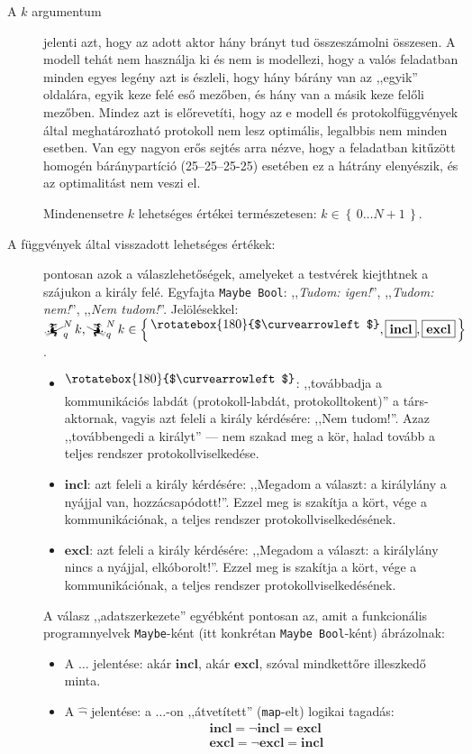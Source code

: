 \documentclass{article}
\newcommand{\nothing}{\text{\raisebox{0.4em}{\rotatebox{180}{$\curvearrowleft$}}}}%
\newcommand{\just}[1]{\boxed{#1}}%
\newcommand{\incl}{\mathbf{incl}}
\newcommand{\excl}{\mathbf{excl}}
\newcommand{\setOf}[1]{\left\lbrace\,#1\,\right\rbrace}
\newcommand{\mainfunA}[3]{\mathwitch_{#2}^{#1}#3}
\newcommand{\mainfunB}[3]{\reversemathwitch_{#2}^{#1}#3}
\begin{document}
\begin{description}
		\item[A $k$ argumentum] jelenti azt, hogy az adott aktor hány brányt tud összeszámolni összesen.
		A modell tehát nem használja ki és nem is modellezi, hogy a valós feladatban minden egyes legény azt is észleli, hogy hány bárány van az ,,egyik'' oldalára, egyik keze felé eső mezőben, és hány van a másik keze felőli mezőben. Mindez azt is előrevetíti, hogy az e modell és protokolfüggvények által meghatározható protokoll nem lesz optimális, legalbbis nem minden esetben. Van egy nagyon erős sejtés arra nézve, hogy a feladatban kitűzött homogén báránypartíció (25--25--25-25) esetében ez a hátrány elenyészik, és az optimalitást nem veszi el.

		Mindenensetre $k$ lehetséges értékei természetesen: $k\in\setOf{0\dots N+1}$.

		\item[A függvények által visszadott lehetséges értékek:] pontosan azok a válaszlehetőségek, amelyeket a testvérek kiejthtnek a szájukon a király felé. Egyfajta \texttt{Maybe Bool}: ,,\textit{Tudom: igen!}'', ,,\textit{Tudom: nem!}'', ,,\textit{Nem tudom!}''. Jelölésekkel: $\mainfunA Nqk, \mainfunB Nqk \in \setOf{\nothing, \just\incl, \just\excl}$.
		\begin{itemize}
			\item $\nothing$: ,,továbbadja a kommunikációs labdát (protokoll-labdát, protokolltokent)'' a társ-aktornak, vagyis azt feleli a király kérdésére: ,,Nem tudom!''.  Azaz ,,továbbengedi a királyt'' --- nem szakad meg a kör, halad tovább a teljes rendszer protokollviselkedése.
			\item $\just\incl$: azt feleli a király kérdésére: ,,Megadom a választ:  a királylány a nyájjal van, hozzácsapódott!''. Ezzel meg is szakítja a kört, vége a kommunikációnak, a teljes rendszer protokollviselkedésének.
			\item $\just\excl$: azt feleli a király kérdésére: ,,Megadom a választ:  a királylány nincs a nyájjal, elkóborolt!''. Ezzel meg is szakítja a kört, vége a kommunikációnak, a teljes rendszer protokollviselkedésének.
		\end{itemize}
		A válasz ,,adatszerkezete'' egyébként pontosan az, amit a funkcionális programnyelvek \texttt{Maybe}-ként (itt konkrétan \texttt{Maybe Bool}-ként) ábrázolnak:
		\begin{itemize}
			\item A $\just{\dots}$ jelentése: akár $\just\incl$, akár $\just\excl$, szóval mindkettőre illeszkedő minta.
			\item A $\hat\lnot$ jelentése: a $\just\dots$-on ,,átvetített'' (\texttt{map}-elt) logikai tagadás:
			\begin{align*}
				\mathop{\hat\lnot}\just\incl = \just{\lnot\incl} = \just\excl\\
				\mathop{\hat\lnot}\just\excl = \just{\lnot\excl} = \just\incl
			\end{align*}
		\end{itemize}
	\end{description} 
	
\end{document}
